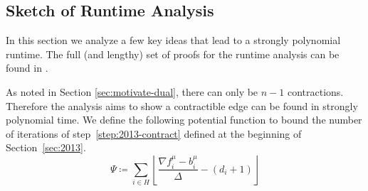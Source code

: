 \documentclass[11pt]{article}
\theoremstyle{definition}
\theoremstyle{definition}
\theoremstyle{definition}
\newcommand{\fu}{f^{\mu}}
\newcommand{\nfiu}{\nabla \fu_i}
\newcommand{\biu}{b_{i}^{\mu}}
\newcommand{\es}{\textsc{Scaling}}
\newcommand{\rewrite}[1]{\textcolor{red}{#1}}
\begin{document}

\subsection{Sketch of Runtime Analysis} \label{sec:runtime2013}
In this section we analyze a few key ideas that lead to a strongly polynomial
runtime. The full (and lengthy) set of proofs for the runtime analysis can be
found in \cite{article}.



As noted in Section \ref{sec:motivate-dual}, there can only be $n-1$ contractions. Therefore
the analysis aims to show a contractible edge can be found in strongly polynomial time.
We define the following potential function to bound the number of iterations of
step~\ref{step:2013-contract} defined at the beginning of Section~\ref{sec:2013}.
\[ \Psi \coloneqq \sum_{i \in H} \left\lfloor \frac{\nfiu - \biu}{\Delta} - (d_i + 1) \right\rfloor \]
\end{document}
